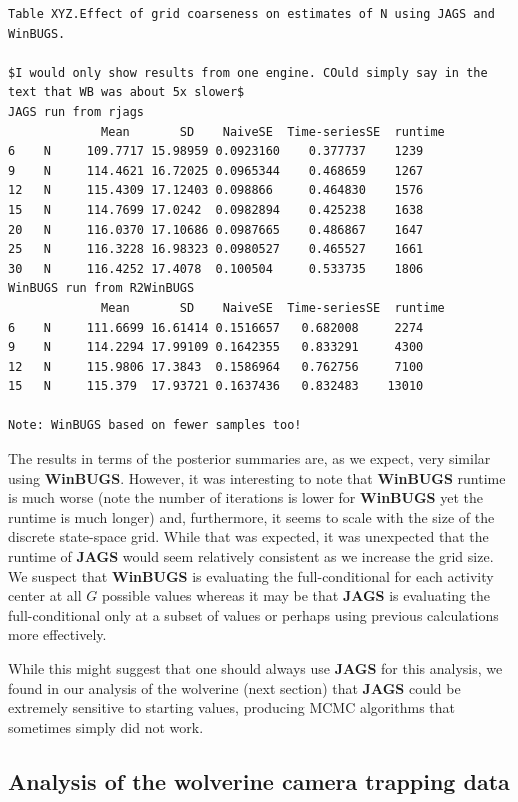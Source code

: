 {\begin{verbatim}
Table XYZ.Effect of grid coarseness on estimates of N using JAGS and
WinBUGS.

$I would only show results from one engine. COuld simply say in the text that WB was about 5x slower$
JAGS run from rjags
             Mean       SD    NaiveSE  Time-seriesSE  runtime
6    N     109.7717 15.98959 0.0923160    0.377737    1239
9    N     114.4621 16.72025 0.0965344    0.468659    1267
12   N     115.4309 17.12403 0.098866     0.464830    1576
15   N     114.7699 17.0242  0.0982894    0.425238    1638
20   N     116.0370 17.10686 0.0987665    0.486867    1647
25   N     116.3228 16.98323 0.0980527    0.465527    1661
30   N     116.4252 17.4078  0.100504     0.533735    1806
WinBUGS run from R2WinBUGS
             Mean       SD    NaiveSE  Time-seriesSE  runtime
6    N     111.6699 16.61414 0.1516657   0.682008     2274
9    N     114.2294 17.99109 0.1642355   0.833291     4300
12   N     115.9806 17.3843  0.1586964   0.762756     7100
15   N     115.379  17.93721 0.1637436   0.832483    13010

Note: WinBUGS based on fewer samples too!
\end{verbatim}

The results in terms of the posterior summaries are, as we
expect, very similar using {\bf WinBUGS}. However, it was interesting
to note that {\bf WinBUGS} runtime is much worse (note the number of
iterations is lower for {\bf WinBUGS} yet the runtime is much longer)
and, furthermore, it seems to scale with the size of the
discrete state-space grid. While that was expected, it was unexpected
that the runtime of {\bf JAGS} would seem relatively consistent
as we increase the grid size.
We suspect that {\bf WinBUGS} is evaluating the full-conditional for
each activity center at all $G$ possible values whereas it may be that
{\bf JAGS} is evaluating the full-conditional only at a subset of
values or perhaps using previous calculations more effectively.

While this might suggest that one should always use {\bf JAGS} for
this analysis, we found in our analysis of the wolverine (next
section) that {\bf JAGS} could be extremely sensitive to starting
values, producing MCMC algorithms that sometimes simply did not work.

\subsection{Analysis of the wolverine camera trapping data}


}
